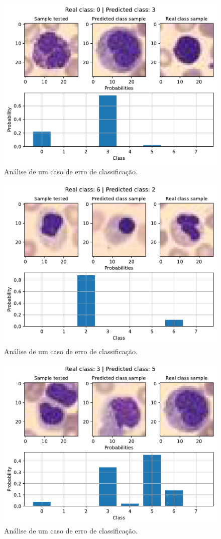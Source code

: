 \begin{figure}[H]
\centering
\includegraphics[width=0.75\linewidth]{../../plot/cnn_shallow/error_analyser_36}
\caption{Análise de um caso de erro de classificação.}
\label{fig:error_analyser_36_cnn}
\end{figure}

\begin{figure}[H]
\centering
\includegraphics[width=0.75\linewidth]{../../plot/cnn_shallow/error_analyser_62}
\caption{Análise de um caso de erro de classificação.}
\label{fig:error_analyser_62_cnn}
\end{figure}

\begin{figure}[H]
\centering
\includegraphics[width=0.75\linewidth]{../../plot/cnn_shallow/error_analyser_1455}
\caption{Análise de um caso de erro de classificação.}
\label{fig:error_analyser_1455}
\end{figure}

